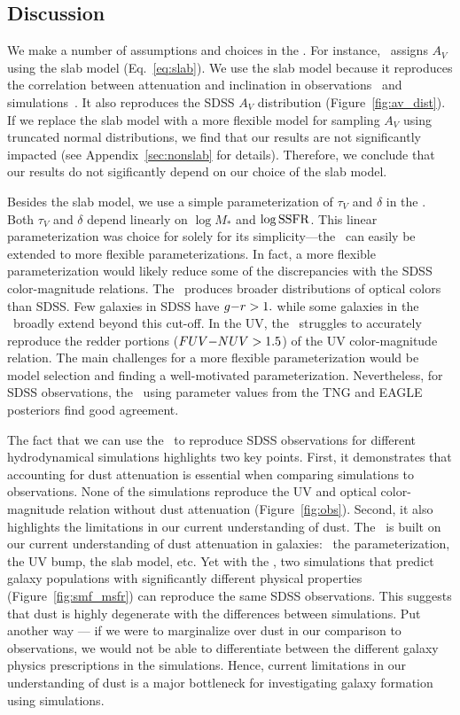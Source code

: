 \subsection{Discussion}  
We make a number of assumptions and choices in the \eda. For instance, 
\eda~assigns $A_V$ using the slab model (Eq.~\ref{eq:slab}). We use the slab
model because it reproduces the correlation between attenuation and inclination 
in observations~\citep{conroy2010b, wild2011, battisti2017, salim2020} and
simulations~\citep[\eg][]{chevallard2013, narayanan2018, trayford2020}.
It also reproduces the SDSS $A_V$ distribution (Figure~\ref{fig:av_dist}). If
we replace the slab model with a more flexible model for sampling $A_V$ using
truncated normal distributions, we find that our results are not significantly
impacted (see Appendix~\ref{sec:nonslab} for details). Therefore, we conclude
that our results do not sigificantly depend on our choice of the slab model. 

Besides the slab model, we use a simple parameterization of $\tau_V$ and
$\delta$ in the \eda. Both $\tau_V$ and $\delta$ depend linearly on $\log M_*$ 
and $\log {\rm SSFR}$. This linear parameterization was choice for solely for
its simplicity---the \eda~can easily be extended to more flexible
parameterizations. In fact, a more flexible parameterization would likely reduce 
some of the discrepancies with the SDSS color-magnitude relations. The
\eda~produces broader distributions of optical colors than SDSS. Few galaxies
in SDSS have $g{-}r > 1.$ while some galaxies in the \eda~broadly extend beyond
this cut-off. In the UV, the \eda~struggles to accurately reproduce the redder
portions ($FUV{-}NUV > 1.5$) of the UV color-magnitude relation. The main
challenges for a more flexible parameterization would be model selection and
finding a well-motivated parameterization. Nevertheless, for SDSS 
observations, the \eda~using parameter values from the TNG and EAGLE
posteriors find good agreement.

The fact that we can use the \eda~to reproduce SDSS observations for different
hydrodynamical simulations highlights two key points. First, it demonstrates 
that accounting for dust attenuation is essential when comparing simulations to
observations. None of the simulations reproduce the UV and optical
color-magnitude relation without dust attenuation (Figure~\ref{fig:obs}). 
Second, it also highlights the limitations in our current understanding of dust. 
The \eda~is built on our current understanding of dust attenuation in galaxies:
\eg~the \citealt{noll2009} parameterization, the UV bump, the slab model, etc.
Yet with the \eda, two simulations that predict galaxy populations with
significantly different physical properties (Figure~\ref{fig:smf_msfr}) can
reproduce the same SDSS observations. This suggests that dust is highly
degenerate with the differences between simulations. Put another way --- if we 
were to marginalize over dust in our comparison to observations, we would not
be able to differentiate between the different galaxy physics prescriptions in
the simulations. Hence, current limitations in our understanding of dust is 
a major bottleneck for investigating galaxy formation using simulations.


